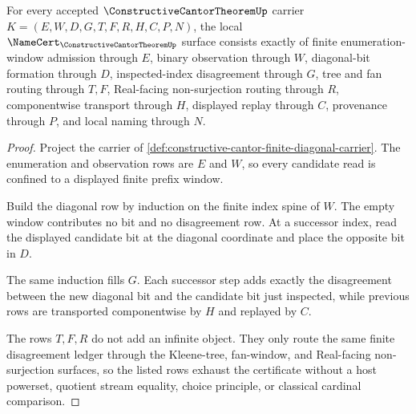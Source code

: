 \begin{theorem}
\label{thm:constructive-cantor-finite-diagonal-obligations}
For every accepted $\ConstructiveCantorTheoremUp$ carrier $K=(E,W,D,G,T,F,R,H,C,P,N)$, the local $\NameCert_{\ConstructiveCantorTheoremUp}$ surface consists exactly of finite enumeration-window admission through $E$, binary observation through $W$, diagonal-bit formation through $D$, inspected-index disagreement through $G$, tree and fan routing through $T,F$, Real-facing non-surjection routing through $R$, componentwise transport through $H$, displayed replay through $C$, provenance through $P$, and local naming through $N$.
\end{theorem}
\begin{proof}
Project the carrier of \autoref{def:constructive-cantor-finite-diagonal-carrier}. The enumeration and observation rows are $E$ and $W$, so every candidate read is confined to a displayed finite prefix window.

Build the diagonal row by induction on the finite index spine of $W$. The empty window contributes no bit and no disagreement row. At a successor index, read the displayed candidate bit at the diagonal coordinate and place the opposite bit in $D$.

The same induction fills $G$. Each successor step adds exactly the disagreement between the new diagonal bit and the candidate bit just inspected, while previous rows are transported componentwise by $H$ and replayed by $C$.

The rows $T,F,R$ do not add an infinite object. They only route the same finite disagreement ledger through the Kleene-tree, fan-window, and Real-facing non-surjection surfaces, so the listed rows exhaust the certificate without a host powerset, quotient stream equality, choice principle, or classical cardinal comparison.
\end{proof}

